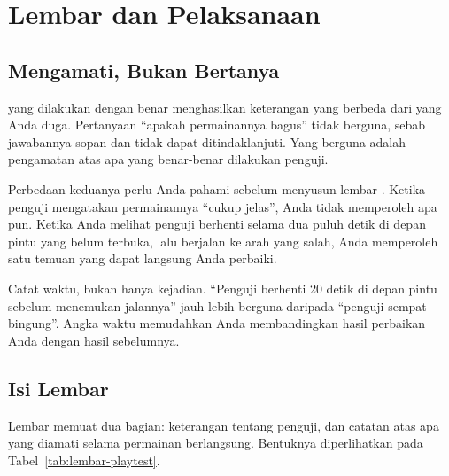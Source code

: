 \section{Lembar dan Pelaksanaan }
\label{sec:lembar-playtest}

\subsection{Mengamati, Bukan Bertanya}

 yang dilakukan dengan benar menghasilkan keterangan yang
berbeda dari yang Anda duga. Pertanyaan ``apakah permainannya bagus'' tidak
berguna, sebab jawabannya sopan dan tidak dapat ditindaklanjuti. Yang berguna
adalah pengamatan atas apa yang benar-benar dilakukan penguji.

Perbedaan keduanya perlu Anda pahami sebelum menyusun lembar
. Ketika penguji mengatakan permainannya ``cukup jelas'',
Anda tidak memperoleh apa pun. Ketika Anda melihat penguji berhenti selama
dua puluh detik di depan pintu yang belum terbuka, lalu berjalan ke arah yang
salah, Anda memperoleh satu temuan yang dapat langsung Anda perbaiki.

\begin{tipsbox}
Catat waktu, bukan hanya kejadian. ``Penguji berhenti 20 detik di depan pintu
sebelum menemukan jalannya'' jauh lebih berguna daripada ``penguji sempat
bingung''. Angka waktu memudahkan Anda membandingkan hasil perbaikan Anda
dengan hasil sebelumnya.
\end{tipsbox}

\subsection{Isi Lembar }

Lembar  memuat dua bagian: keterangan tentang penguji, dan
catatan atas apa yang diamati selama permainan berlangsung. Bentuknya
diperlihatkan pada Tabel~\ref{tab:lembar-playtest}.

